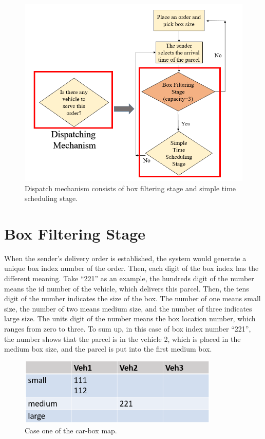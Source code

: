\documentclass[12pt]{ksthesis}
\begin{document}
\begin{thesis}
{\begin{figure}[H]
\centering
\includegraphics[width=1.0\textwidth]{./Thesis_figures/F6-1_dispatching_mechanism.PNG}
\caption{\large Dispatch mechanism consists of box filtering stage and simple time scheduling stage.}
\vspace{0.5cm}
\label{Fig:Dispatch_mechanism}
\end{figure}

\section{Box Filtering Stage }
When the sender’s delivery order is established, the system would generate a unique box index number of the order. Then, each digit of the box index has the different meaning. Take “221” as an example, the hundreds digit of the number means the id number of the vehicle, which delivers this parcel. Then, the tens digit of the number indicates the size of the box. The number of one means small size, the number of two means medium size, and the number of three indicates large size. The units digit of the number means the box location number, which ranges from zero to three. 
To sum up, in this case of box index number “221”, the number shows that the parcel is in the vehicle 2, which is placed in the medium box size, and the parcel is put into the first medium box.

\begin{figure}[H]
\centering
\includegraphics[width=0.85\textwidth]{./Thesis_figures/F6-2_caseOne_boxFiltering.PNG}
\caption{\large Case one of the car-box map.}
\vspace{0.5cm}
\label{Fig:CaseOne_carBox_Map}
\end{figure}

}
\end{thesis}
\end{document}
